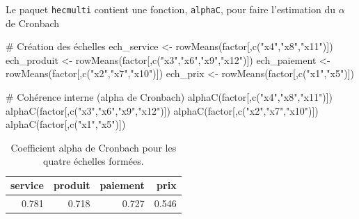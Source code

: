 \documentclass[
  11pt,
  letterpaper,
]{scrbook}
\newenvironment{Shaded}{\begin{snugshade}}{\end{snugshade}}
\newcommand{\CommentTok}[1]{\textcolor[rgb]{0.37,0.37,0.37}{#1}}
\newcommand{\FunctionTok}[1]{\textcolor[rgb]{0.28,0.35,0.67}{#1}}
\newcommand{\NormalTok}[1]{\textcolor[rgb]{0.00,0.23,0.31}{#1}}
\newcommand{\OtherTok}[1]{\textcolor[rgb]{0.00,0.23,0.31}{#1}}
\newcommand{\StringTok}[1]{\textcolor[rgb]{0.13,0.47,0.30}{#1}}
\theoremstyle{definition}
\theoremstyle{remark}
\begin{document}
Le paquet \texttt{hecmulti} contient une fonction, \texttt{alphaC}, pour
faire l'estimation du \(\alpha\) de Cronbach

\begin{Shaded}
\begin{Highlighting}[]
\CommentTok{\# Création des échelles}
\NormalTok{ech\_service }\OtherTok{\textless{}{-}} \FunctionTok{rowMeans}\NormalTok{(factor[,}\FunctionTok{c}\NormalTok{(}\StringTok{"x4"}\NormalTok{,}\StringTok{"x8"}\NormalTok{,}\StringTok{"x11"}\NormalTok{)])}
\NormalTok{ech\_produit }\OtherTok{\textless{}{-}} \FunctionTok{rowMeans}\NormalTok{(factor[,}\FunctionTok{c}\NormalTok{(}\StringTok{"x3"}\NormalTok{,}\StringTok{"x6"}\NormalTok{,}\StringTok{"x9"}\NormalTok{,}\StringTok{"x12"}\NormalTok{)])}
\NormalTok{ech\_paiement }\OtherTok{\textless{}{-}} \FunctionTok{rowMeans}\NormalTok{(factor[,}\FunctionTok{c}\NormalTok{(}\StringTok{"x2"}\NormalTok{,}\StringTok{"x7"}\NormalTok{,}\StringTok{"x10"}\NormalTok{)])}
\NormalTok{ech\_prix }\OtherTok{\textless{}{-}} \FunctionTok{rowMeans}\NormalTok{(factor[,}\FunctionTok{c}\NormalTok{(}\StringTok{"x1"}\NormalTok{,}\StringTok{"x5"}\NormalTok{)])}

\CommentTok{\# Cohérence interne (alpha de Cronbach)}
\FunctionTok{alphaC}\NormalTok{(factor[,}\FunctionTok{c}\NormalTok{(}\StringTok{"x4"}\NormalTok{,}\StringTok{"x8"}\NormalTok{,}\StringTok{"x11"}\NormalTok{)])}
\FunctionTok{alphaC}\NormalTok{(factor[,}\FunctionTok{c}\NormalTok{(}\StringTok{"x3"}\NormalTok{,}\StringTok{"x6"}\NormalTok{,}\StringTok{"x9"}\NormalTok{,}\StringTok{"x12"}\NormalTok{)])}
\FunctionTok{alphaC}\NormalTok{(factor[,}\FunctionTok{c}\NormalTok{(}\StringTok{"x2"}\NormalTok{,}\StringTok{"x7"}\NormalTok{,}\StringTok{"x10"}\NormalTok{)])}
\FunctionTok{alphaC}\NormalTok{(factor[,}\FunctionTok{c}\NormalTok{(}\StringTok{"x1"}\NormalTok{,}\StringTok{"x5"}\NormalTok{)])}
\end{Highlighting}
\end{Shaded}

\begin{longtable}[t]{rrrr}

\caption{\label{tbl-alphaCronbach}Coefficient alpha de Cronbach pour les
quatre échelles formées.}

\tabularnewline

\toprule
service & produit & paiement & prix\\
\midrule
0.781 & 0.718 & 0.727 & 0.546\\
\bottomrule

\end{longtable}
\end{document}

